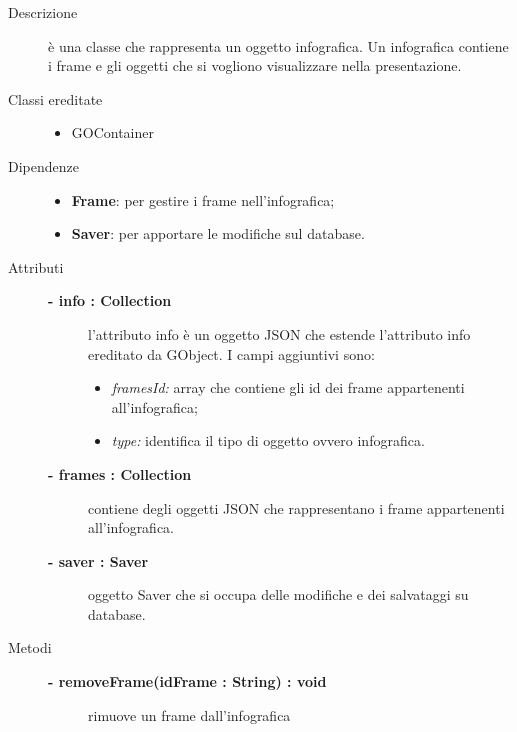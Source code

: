 \begin{description}
\item[Descrizione] \hfill
	è una classe che rappresenta un oggetto infografica. Un infografica contiene i frame e gli oggetti che si vogliono visualizzare nella presentazione.
	
\item[Classi ereditate] \hfill
	\begin{itemize}
		\item GOContainer
	\end{itemize}
	
\item[Dipendenze] \hfill
	\begin{itemize}
		\item \textbf{Frame}: per gestire i frame nell'infografica;
		\item \textbf{Saver}: per apportare le modifiche sul database.
	\end{itemize}	
	
\item[Attributi] \hfill
	\begin{description}
		\item[\textbf{- info : Collection			}] \hfill
			l'attributo info è un oggetto JSON che estende l'attributo info ereditato da GObject. I campi aggiuntivi sono:
	\begin{itemize}
		\item \textit{framesId:} array che contiene gli id dei frame appartenenti all'infografica;
		\item \textit{type:} identifica il tipo di oggetto ovvero infografica.		
	\end{itemize}
		\item[\textbf{- frames : Collection			}] \hfill
			contiene degli oggetti JSON che rappresentano i frame appartenenti all'infografica.
		\item[\textbf{- saver : Saver			}] \hfill
			oggetto Saver che si occupa delle modifiche e dei salvataggi su database.
	\end{description}	
	
\item[Metodi] \hfill

		\begin{description}
		\item[\textbf{\color{blue}- removeFrame(idFrame : String) : void			}] \hfill
			rimuove un frame dall'infografica
			

\end{description}
\end{description}
